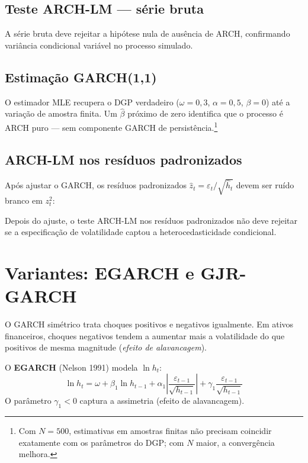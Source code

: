 \subsection*{Teste ARCH-LM — série bruta}

A série bruta deve rejeitar a hipótese nula de ausência de ARCH, confirmando
variância condicional variável no processo simulado.

\subsection*{Estimação GARCH(1,1)}

O estimador MLE recupera o DGP verdadeiro ($\omega=0{,}3$, $\alpha=0{,}5$,
$\beta=0$) até a variação de amostra finita. Um $\hat\beta$ próximo de zero
identifica que o processo é ARCH puro — sem componente GARCH de persistência.\footnote{%
  Com $N=500$, estimativas em amostras finitas não precisam coincidir
  exatamente com os parâmetros do DGP; com $N$ maior, a convergência melhora.}

\subsection*{ARCH-LM nos resíduos padronizados}

Após ajustar o GARCH, os resíduos padronizados $\hat{z}_t = \varepsilon_t / \sqrt{\hat{h}_t}$
devem ser ruído branco em $z_t^2$:

Depois do ajuste, o teste ARCH-LM nos resíduos padronizados não deve rejeitar
se a especificação de volatilidade captou a heterocedasticidade condicional.

\section{Variantes: EGARCH e GJR-GARCH}

O GARCH simétrico trata choques positivos e negativos igualmente. Em
ativos financeiros, choques negativos tendem a aumentar mais a volatilidade
do que positivos de mesma magnitude (\emph{efeito de alavancagem}).

O \textbf{EGARCH} (Nelson 1991) modela $\ln h_t$:
\[
  \ln h_t = \omega + \beta_1 \ln h_{t-1}
             + \alpha_1 \left|\frac{\varepsilon_{t-1}}{\sqrt{h_{t-1}}}\right|
             + \gamma_1 \frac{\varepsilon_{t-1}}{\sqrt{h_{t-1}}}
\]
O parâmetro $\gamma_1 < 0$ captura a assimetria (efeito de alavancagem).

